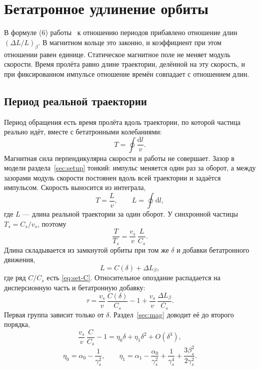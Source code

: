 \section{Бетатронное удлинение орбиты}
\label{sec:beta}

В формуле (6) работы~\cite{Senichev2013} к отношению периодов прибавлено отношение длин $(\Delta L/L)_\beta$. В магнитном кольце это законно, и коэффициент при этом отношении равен единице. Статическое магнитное поле не меняет модуль скорости. Время пролёта равно длине траектории, делённой на эту скорость, и при фиксированном импульсе отношение времён совпадает с отношением длин.

\subsection{Период реальной траектории}
\label{sec:beta-time}

Период обращения есть время пролёта вдоль траектории, по которой частица реально идёт, вместе с бетатронными колебаниями:
\begin{equation}
\label{eq:beta-T}
T=\oint\frac{\mathrm{d}l}{v}.
\end{equation}
Магнитная сила перпендикулярна скорости и работы не совершает. Зазор в модели раздела~\ref{sec:setup} тонкий: импульс меняется один раз за оборот, а между зазорами модуль скорости постоянен вдоль всей траектории и задаётся импульсом. Скорость выносится из интеграла,
\begin{equation}
\label{eq:beta-Lv}
T=\frac{L}{v},\qquad L=\oint\mathrm{d}l,
\end{equation}
где $L$ --- длина реальной траектории за один оборот. У синхронной частицы $T_s=C_s/v_s$, поэтому
\begin{equation}
\label{eq:beta-ratio}
\frac{T}{T_s}=\frac{v_s}{v}\,\frac{L}{C_s}.
\end{equation}
Длина складывается из замкнутой орбиты при том же $\delta$ и добавки бетатронного движения,
\begin{equation}
\label{eq:beta-split}
L=C(\delta)+\Delta L_\beta,
\end{equation}
где ряд $C/C_s$ есть \eqref{eq:set-C}. Относительное опоздание распадается на дисперсионную часть и бетатронную добавку:
\begin{equation}
\label{eq:beta-tau-raw}
\tau
=\frac{v_s}{v}\,\frac{C(\delta)}{C_s}-1
+\frac{v_s}{v}\,\frac{\Delta L_\beta}{C_s}.
\end{equation}
Первая группа зависит только от $\delta$. Раздел~\ref{sec:mag} доводит её до второго порядка,
\begin{equation}
\label{eq:beta-eta}
\frac{v_s}{v}\,\frac{C}{C_s}-1=\eta_0\delta+\eta_1\delta^2+O(\delta^3),
\end{equation}
\begin{equation}
\label{eq:beta-etas}
\eta_0=\alpha_0-\frac{1}{\gamma_s^2},
\qquad
\eta_1=\alpha_1-\frac{\alpha_0}{\gamma_s^2}+\frac{1}{\gamma_s^4}+\frac{3\beta_s^2}{2\gamma_s^2}.
\end{equation}

